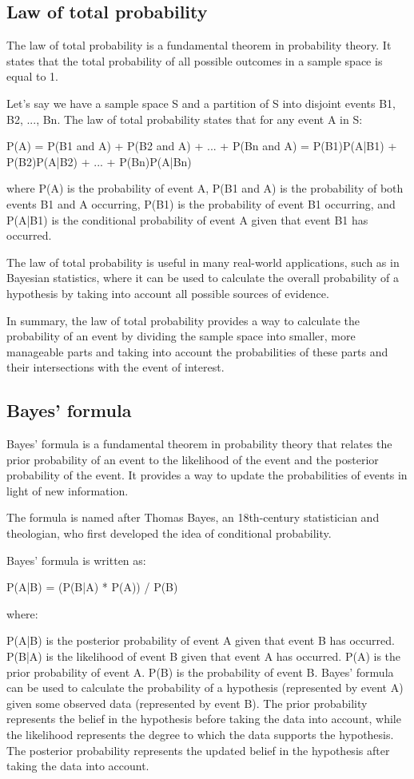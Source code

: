 \documentclass[12pt, a4paper, oneside]{article}
\begin{document}
\subsection{ Law of total probability }
The law of total probability is a fundamental theorem in probability theory. It states that the total probability of all possible outcomes in a sample space is equal to 1.

Let's say we have a sample space S and a partition of S into disjoint events B1, B2, ..., Bn. The law of total probability states that for any event A in S:

P(A) = P(B1 and A) + P(B2 and A) + ... + P(Bn and A) = P(B1)P(A|B1) + P(B2)P(A|B2) + ... + P(Bn)P(A|Bn)

where P(A) is the probability of event A, P(B1 and A) is the probability of both events B1 and A occurring, P(B1) is the probability of event B1 occurring, and P(A|B1) is the conditional probability of event A given that event B1 has occurred.

The law of total probability is useful in many real-world applications, such as in Bayesian statistics, where it can be used to calculate the overall probability of a hypothesis by taking into account all possible sources of evidence.

In summary, the law of total probability provides a way to calculate the probability of an event by dividing the sample space into smaller, more manageable parts and taking into account the probabilities of these parts and their intersections with the event of interest.




\subsection{ Bayes’ formula }
Bayes' formula is a fundamental theorem in probability theory that relates the prior probability of an event to the likelihood of the event and the posterior probability of the event. It provides a way to update the probabilities of events in light of new information.

The formula is named after Thomas Bayes, an 18th-century statistician and theologian, who first developed the idea of conditional probability.

Bayes' formula is written as:

P(A|B) = (P(B|A) * P(A)) / P(B)

where:

P(A|B) is the posterior probability of event A given that event B has occurred.
P(B|A) is the likelihood of event B given that event A has occurred.
P(A) is the prior probability of event A.
P(B) is the probability of event B.
Bayes' formula can be used to calculate the probability of a hypothesis (represented by event A) given some observed data (represented by event B). The prior probability represents the belief in the hypothesis before taking the data into account, while the likelihood represents the degree to which the data supports the hypothesis. The posterior probability represents the updated belief in the hypothesis after taking the data into account.
\end{document}
